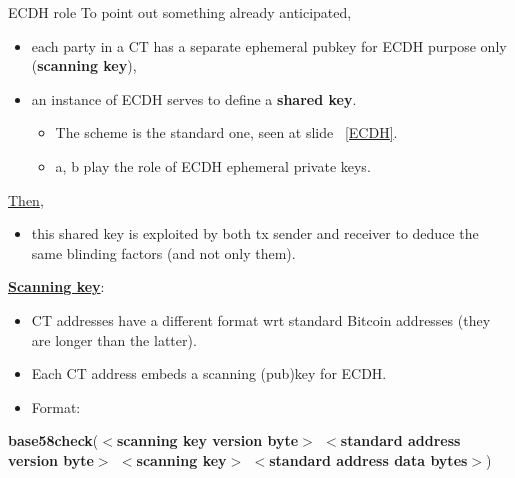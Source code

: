 \documentclass[10.5pt,compress]{beamer}
\begin{document}
\begin{frame}{ECDH role}
    To point out something already anticipated,
    \begin{itemize}
        \item each party in a CT has a separate ephemeral pubkey for ECDH purpose only (\textbf{scanning key}),
        \item an instance of ECDH serves to define a \textbf{shared key}.
        \begin{itemize}
            \item The scheme is the standard one, seen at slide ~\ref{ECDH}.
            \item a, b play the role of ECDH ephemeral private keys.
        \end{itemize}
    \end{itemize}
    \underline{Then}, 
    \begin{itemize}
        \item this shared key is exploited by both tx sender and receiver to deduce the same blinding factors (and not only them).
    \end{itemize}
\end{frame}

\begin{frame}{}
    \textbf{\underline{Scanning key}}:
    \begin{itemize}
        \item CT addresses have a different format wrt standard Bitcoin addresses (they are longer than the latter).
        \item Each CT address embeds a scanning (pub)key for ECDH.
        \item Format:
        \end{itemize}
        \begin{center}
            \textbf{base58check}(\textbf{$<$scanning key version byte$>$ $<$standard address version byte$>$ $<$scanning key$>$ $<$standard address data bytes$>$})
        \end{center}
\end{frame}
\end{document}
